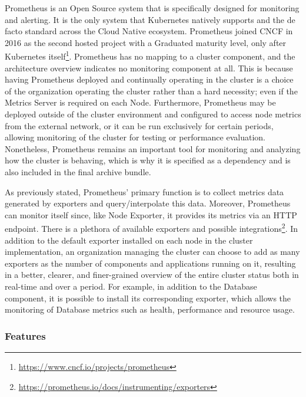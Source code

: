 Prometheus is an Open Source system that is specifically designed for monitoring
and alerting. It is the only system that Kubernetes natively supports and the de
facto standard across the Cloud Native ecosystem\cite{prometheus_overview_faq}. Prometheus
joined CNCF in 2016 as the second hosted project with a Graduated maturity level,
only after Kubernetes itself\footnote{\url{https://www.cncf.io/projects/prometheus}}\cite{prometheus_overview}.
Prometheus has no mapping to a cluster component, and the architecture overview indicates
no monitoring component at all. This is because having Prometheus deployed and
continually operating in the cluster is a choice of the organization operating
the cluster rather than a hard necessity; even if the Metrics Server is required
on each Node. Furthermore, Prometheus may be deployed outside of the cluster environment
and configured to access node metrics from the external network, or it can be
run exclusively for certain periods, allowing monitoring of the cluster for testing
or performance evaluation. Nonetheless, Prometheus remains an important tool for
monitoring and analyzing how the cluster is behaving, which is why it is
specified as a dependency and is also included in the final archive bundle.

As previously stated, Prometheus' primary function is to collect metrics data
generated by exporters and query/interpolate this data. Moreover, Prometheus can
monitor itself since, like Node Exporter, it provides its metrics via an HTTP
endpoint. There is a plethora of available exporters and possible integrations\footnote{\url{https://prometheus.io/docs/instrumenting/exporters}}.
In addition to the default exporter installed on each node in the cluster
implementation, an organization managing the cluster can choose to add as many exporters
as the number of components and applications running on it, resulting in a
better, clearer, and finer-grained overview of the entire cluster status both in
real-time and over a period. For example, in addition to the Database component,
it is possible to install its corresponding exporter, which allows the
monitoring of Database metrics such as health, performance and resource usage.

\subsubsection{Features}
\label{subsubsec:implementation_dependencies_prometheus_features}


